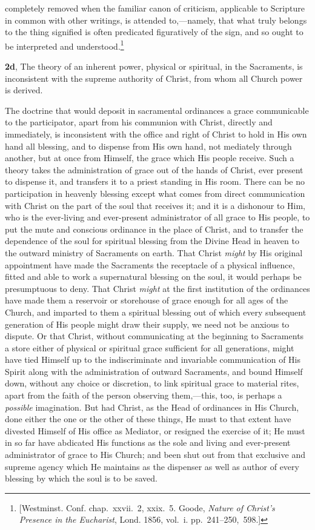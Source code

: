 \documentclass[
]{book}
\begin{document}
completely removed when the familiar canon of criticism, applicable to Scripture in common with other writings, is attended to,---namely, that what truly belongs to the thing signified is often predicated figuratively of the sign, and so ought to be interpreted and understood.\footnote{{[}Westminst. Conf. chap.~xxvii.~2, xxix.~5. Goode, \emph{Nature of Christ's Presence in the Eucharist}, Lond. 1856, vol.~i. pp.~241--250,~598.{]}}

\textbf{2d}, The theory of an inherent power, physical or spiritual, in the Sacraments, is inconsistent with the supreme authority of Christ, from whom all Church power is derived.

The doctrine that would deposit in sacramental ordinances a grace communicable to the participator, apart from his communion with Christ, directly and immediately, is inconsistent with the office and right of Christ to hold in His own hand all blessing, and to dispense from His own hand, not mediately through another, but at once from Himself, the grace which His people receive. Such a theory takes the administration of grace out of the hands of Christ, ever present to dispense it, and transfers it to a priest standing in His room. There can be no participation in heavenly blessing except what comes from direct communication with Christ on the part of the soul that receives it; and it is a dishonour to Him, who is the ever-living and ever-present administrator of all grace to His people, to put the mute and conscious ordinance in the place of Christ, and to transfer the dependence of the soul for spiritual blessing from the Divine Head in heaven to the outward ministry of Sacraments on earth. That Christ \emph{might} by His original appointment have made the Sacraments the receptacle of a physical influence, fitted and able to work a supernatural blessing on the soul, it would perhaps be presumptuous to deny. That Christ \emph{might} at the first institution of the ordinances have made them a reservoir or storehouse of grace enough for all ages of the Church, and imparted to them a spiritual blessing out of which every subsequent generation of His people might draw their supply, we need not be anxious to dispute. Or that Christ, without communicating at the beginning to Sacraments a store either of physical or spiritual grace sufficient for all generations, might have tied Himself up to the indiscriminate and invariable communication of His Spirit along with the administration of outward Sacraments, and bound Himself down, without any choice or discretion, to link spiritual grace to material rites, apart from the faith of the person observing them,---this, too, is perhaps a \emph{possible} imagination. But had Christ, as the Head of ordinances in His Church, done either the one or the other of these things, He must to that extent have divested Himself of His office as Mediator, or resigned the exercise of it; He must in so far have abdicated His functions as the sole and living and ever-present administrator of grace to His Church; and been shut out from that exclusive and supreme agency which He maintains as the dispenser as well as author of every blessing by which the soul is to be saved.
\end{document}
